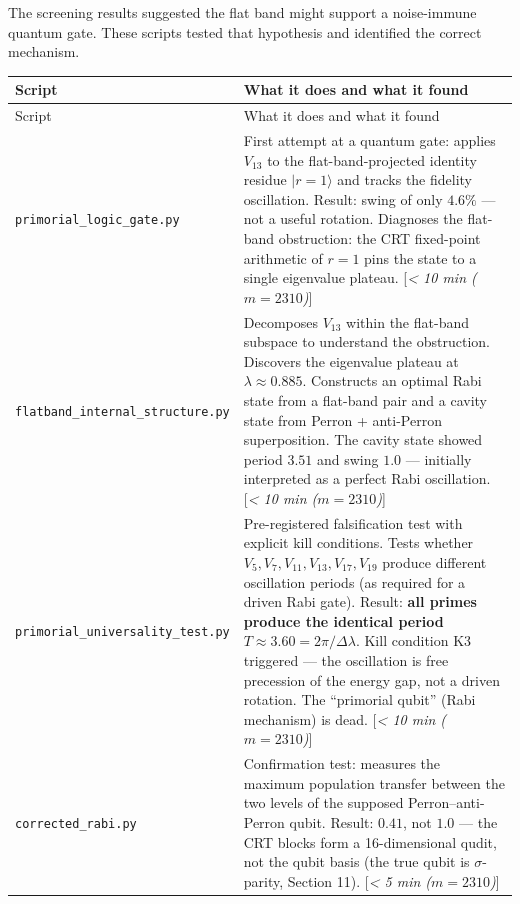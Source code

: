 \documentclass[11pt,letterpaper]{article}
\theoremstyle{definition}
\theoremstyle{remark}
\begin{document}
The screening results suggested the flat band might support a noise-immune quantum gate. These scripts tested that hypothesis and identified the correct mechanism.

\begin{longtable}[]{@{}
  >{\raggedright\arraybackslash}p{}
  >{\raggedright\arraybackslash}p{}@{}}
\toprule
Script & What it does and what it found \\
\midrule
\endfirsthead
\toprule
Script & What it does and what it found \\
\midrule
\endhead
\texttt{primorial\_logic\_gate.py} & First attempt at a quantum gate: applies $V_{13}$ to the flat-band-projected identity residue $\lvert r = 1\rangle$ and tracks the fidelity oscillation. Result: swing of only $4.6\%$ --- not a useful rotation. Diagnoses the flat-band obstruction: the CRT fixed-point arithmetic of $r = 1$ pins the state to a single eigenvalue plateau. [\textit{\textless{} 10 min ($m = 2310$)}] \\
\texttt{flatband\_internal\_\hspace{0pt}structure.py} & Decomposes $V_{13}$ within the flat-band subspace to understand the obstruction. Discovers the eigenvalue plateau at $\lambda \approx 0.885$. Constructs an optimal Rabi state from a flat-band pair and a cavity state from Perron + anti-Perron superposition. The cavity state showed period $3.51$ and swing $1.0$ --- initially interpreted as a perfect Rabi oscillation. [\textit{\textless{} 10 min ($m = 2310$)}] \\
\texttt{primorial\_universality\_\hspace{0pt}test.py} & Pre-registered falsification test with explicit kill conditions. Tests whether $V_5, V_7, V_{11}, V_{13}, V_{17}, V_{19}$ produce different oscillation periods (as required for a driven Rabi gate). Result: \textbf{all primes produce the identical period} $T \approx 3.60 = 2\pi/\Delta\lambda$. Kill condition K3 triggered --- the oscillation is free precession of the energy gap, not a driven rotation. The ``primorial qubit'' (Rabi mechanism) is dead. [\textit{\textless{} 10 min ($m = 2310$)}] \\
\texttt{corrected\_rabi.py} & Confirmation test: measures the maximum population transfer between the two levels of the supposed Perron--anti-Perron qubit. Result: $0.41$, not $1.0$ --- the CRT blocks form a 16-dimensional qudit, not the qubit basis (the true qubit is $\sigma$-parity, Section 11). [\textit{\textless{} 5 min ($m = 2310$)}] \\

\end{longtable}
\end{document}
